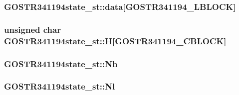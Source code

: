 \subsubsection[{\texorpdfstring{data}{data}}]{ G\+O\+S\+T\+R341194state\+\_\+st\+::data\mbox{[}{\bf G\+O\+S\+T\+R341194\+\_\+\+L\+B\+L\+O\+CK}\mbox{]}}\hypertarget{struct_g_o_s_t_r341194state__st_acce5d551a5aefd231a22c82ad6e9a309}{}\label{struct_g_o_s_t_r341194state__st_acce5d551a5aefd231a22c82ad6e9a309}
\subsubsection[{\texorpdfstring{H}{H}}]{\setlength{\rightskip}{0pt plus 5cm}unsigned char G\+O\+S\+T\+R341194state\+\_\+st\+::H\mbox{[}{\bf G\+O\+S\+T\+R341194\+\_\+\+C\+B\+L\+O\+CK}\mbox{]}}\hypertarget{struct_g_o_s_t_r341194state__st_a27982d411df34040a40ff22b8af1c96e}{}\label{struct_g_o_s_t_r341194state__st_a27982d411df34040a40ff22b8af1c96e}
\subsubsection[{\texorpdfstring{Nh}{Nh}}]{ G\+O\+S\+T\+R341194state\+\_\+st\+::\+Nh}\hypertarget{struct_g_o_s_t_r341194state__st_a8fe637797280e1c61a352012700d46b0}{}\label{struct_g_o_s_t_r341194state__st_a8fe637797280e1c61a352012700d46b0}
\subsubsection[{\texorpdfstring{Nl}{Nl}}]{ G\+O\+S\+T\+R341194state\+\_\+st\+::\+Nl}\hypertarget{struct_g_o_s_t_r341194state__st_a3828ade31401440954270121cd33ed1a}{}\label{struct_g_o_s_t_r341194state__st_a3828ade31401440954270121cd33ed1a}
